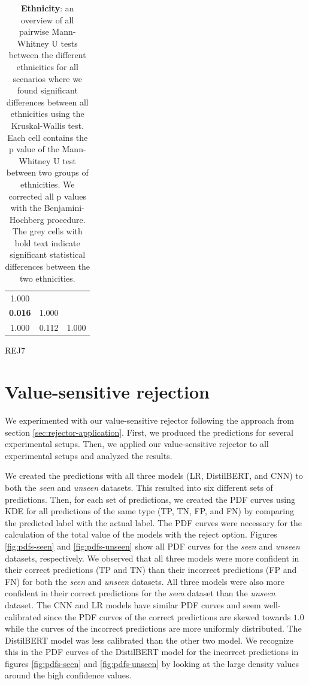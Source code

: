 \begin{table}
\begin{subtable}{.21\textwidth}
\begin{tabular}{ccc}
            \midrule
            1.000                                  &                           &                           \\
            \cellcolor[HTML]{EFEFEF}\textbf{0.016} & \multicolumn{1}{r}{1.000} &                           \\
            1.000                                  & \multicolumn{1}{r}{0.112} & \multicolumn{1}{r}{1.000} \\
            \bottomrule
        \end{tabular}
        \caption{REJ7}
    \end{subtable}
    \caption{\textbf{Ethnicity}: an overview of all pairwise Mann-Whitney U tests between the different ethnicities for all scenarios where we found significant differences between all ethnicities using the Kruskal-Wallis test. Each cell contains the p value of the Mann-Whitney U test between two groups of ethnicities. We corrected all p values with the Benjamini-Hochberg procedure. The grey cells with bold text indicate significant statistical differences between the two ethnicities.}
    \label{tab:results-pairwise-ethnicity}
\end{table}

\section{Value-sensitive rejection}
\label{sec:results-rejector}
We experimented with our value-sensitive rejector following the approach from section \ref{sec:rejector-application}.
%
First, we produced the predictions for several experimental setups.
%
Then, we applied our value-sensitive rejector to all experimental setups and analyzed the results.
%

%
We created the predictions with all three models (LR, DistilBERT, and CNN) to both the \emph{seen} and \emph{unseen} datasets.
%
This resulted into six different sets of predictions.
%
Then, for each set of predictions, we created the PDF curves using KDE for all predictions of the same type (TP, TN, FP, and FN) by comparing the predicted label with the actual label.
%
The PDF curves were necessary for the calculation of the total value of the models with the reject option.
%
Figures \ref{fig:pdfs-seen} and \ref{fig:pdfs-unseen} show all PDF curves for the \emph{seen} and \emph{unseen} datasets, respectively.
%
We observed that all three models were more confident in their correct predictions (TP and TN) than their incorrect predictions (FP and FN) for both the \emph{seen} and \emph{unseen} datasets.
%
All three models were also more confident in their correct predictions for the \emph{seen} dataset than the \emph{unseen} dataset.
%
The CNN and LR models have similar PDF curves and seem well-calibrated since the PDF curves of the correct predictions are skewed towards $1.0$ while the curves of the incorrect predictions are more uniformly distributed.
%
The DistilBERT model was less calibrated than the other two model.
%
We recognize this in the PDF curves of the DistilBERT model for the incorrect predictions in figures \ref{fig:pdfs-seen} and \ref{fig:pdfs-unseen} by looking at the large density values around the high confidence values.
%

